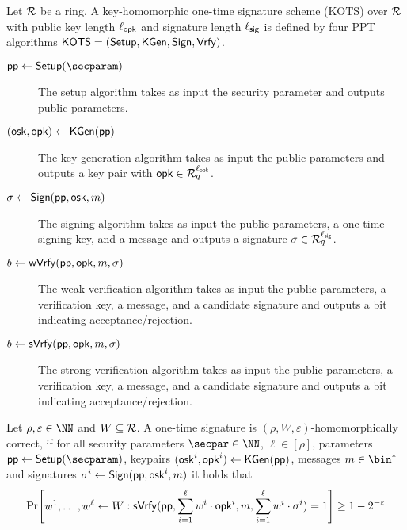 \begin{definition}\label{def:hots}
  Let $\mathcal{R}$ be a ring.
  A key-homomorphic one-time signature scheme (KOTS) over $\mathcal{R}$ with public key length ${\ell_{\mathsf{opk}}}$ and signature length ${\ell_{\mathsf{sig}}}$ is defined by four PPT algorithms $\mathsf{KOTS}=(\mathsf{Setup},\mathsf{KGen},\mathsf{Sign},\mathsf{Vrfy})$.
  \begin{description}
    \item[$\params\gets\setup(\secparam)$] The setup algorithm takes as input the security parameter and outputs public parameters.
    \item[$(\mathsf{osk},\mathsf{opk}) \gets \mathsf{KGen}(\mathsf{pp})$] The key generation algorithm takes as input the public parameters and outputs a key pair with $\mathsf{opk}\in\mathcal{R}_q^{\ell_{\mathsf{opk}}}$.
    \item[$\sigma \gets \mathsf{Sign}(\mathsf{pp},\mathsf{osk},m)$] The signing algorithm takes as input the public parameters, a one-time signing key, and a message and outputs a signature $\sigma\in\mathcal{R}_q^{\ell_{\mathsf{sig}}}$.
    \item[$b\gets \mathsf{wVrfy}(\mathsf{pp},\mathsf{opk},m,\sigma)$] The weak verification algorithm takes as input the public parameters, a verification key, a message, and a candidate signature and outputs a bit indicating acceptance/rejection.
    \item[$b\gets \mathsf{sVrfy}(\mathsf{pp},\mathsf{opk},m,\sigma)$] The strong verification algorithm takes as input the public parameters, a verification key, a message, and a candidate signature and outputs a bit indicating acceptance/rejection.
  \end{description}
  Let $\rho,\varepsilon \in \NN$ and $W\subseteq \mathcal{R}$.
  A one-time signature is $(\rho,W,\varepsilon)$-homomorphically correct, if 
  for all security parameters $\secpar\in\NN$, $\ell\in[\rho]$, parameters $\params \gets \setup(\secparam)$, keypairs $(\mathsf{osk}^i,\mathsf{opk}^i) \gets \mathsf{KGen}(\mathsf{pp})$, messages $m\in\bin^*$ and signatures $\sigma^i \gets \mathsf{Sign}(\mathsf{pp},\mathsf{osk}^i,m)$ it holds that
  \[
    \Pr\mleft[
      \begin{aligned}
      w^1,\dots,w^\ell\gets W
      \end{aligned}:
      \sverify(\params,\sum_{i=1}^{\ell}w^i\cdot\opk^i,m,\sum_{i=1}^{\ell}w^i\cdot\sigma^i) = 1
    \mright]\geq 1-2^{-\varepsilon}
  \]
\end{definition}

